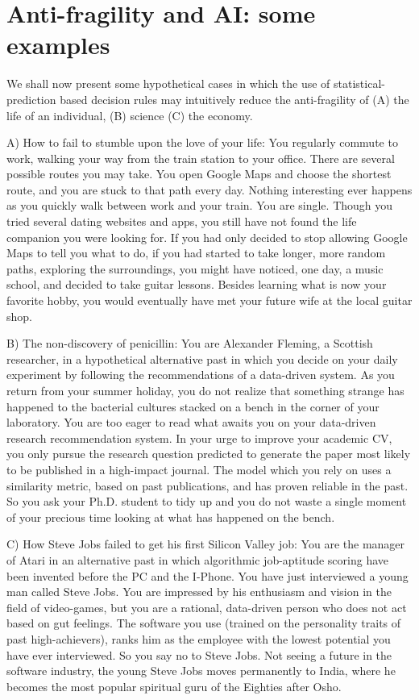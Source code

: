 \documentclass[conference]{IEEEtran}
\begin{document}
\section{Anti-fragility and AI: some examples}

We shall now present some hypothetical cases in which the use of statistical-prediction based decision rules may intuitively reduce the anti-fragility of (A) the life of an individual, (B) science (C) the economy. 

A) How to fail to stumble upon the love of your life: You regularly commute to work, walking your way from the train station to your office. There are several possible routes you may take. You open Google Maps and choose the shortest route, and you are stuck to that path every day. Nothing interesting ever happens as you quickly walk between work and your train. You are single. Though you tried several dating websites and apps, you still have not found the life companion you were looking for. If you had only decided to stop allowing Google Maps to tell you what to do, if you had started to take longer, more random paths, exploring the surroundings, you might have noticed, one day, a music school, and decided to take guitar lessons. Besides learning what is now your favorite hobby, you would eventually have met your future wife at the local guitar shop.  

B) The non-discovery of penicillin: You are Alexander Fleming, a Scottish researcher, in a hypothetical alternative past in which you decide on your daily experiment by following the recommendations of a data-driven system. As you return from your summer holiday, you do not realize that something strange has happened to the bacterial cultures stacked on a bench in the corner of your laboratory. You are too eager to read what awaits you on your data-driven research recommendation system. In your urge to improve your academic CV, you only pursue the research question predicted to generate the paper most likely to be published in a high-impact journal. The model which you rely on uses a similarity metric, based on past publications, and has proven reliable in the past. So you ask your Ph.D. student to tidy up and you do not waste a single moment of your precious time looking at what has happened on the bench.

C) How Steve Jobs failed to get his first Silicon Valley job: You are the manager of Atari in an alternative past in which algorithmic job-aptitude scoring have been invented before the PC and the I-Phone. You have just interviewed a young man called Steve Jobs. You are impressed by his  enthusiasm and vision in the field of video-games, but you are a rational, data-driven person who does not act based on gut feelings. The software you use (trained on the personality traits of past high-achievers), ranks him as the employee with the lowest potential you have ever interviewed. So you say no to Steve Jobs. Not seeing a future in the software industry, the young Steve Jobs moves permanently to India, where he becomes the most popular spiritual guru of the Eighties after Osho.
\end{document}

